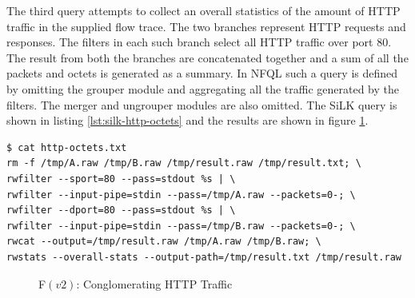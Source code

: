 The third query attempts to collect an overall statistics of the amount of
HTTP traffic in the supplied flow trace. The two branches represent HTTP
requests and responses. The filters in each such branch select all HTTP
traffic over port $80$. The result from both the branches are
 concatenated together and a sum of all
the packets and octets is generated as a summary. In NFQL such a query is
defined by omitting the grouper module and aggregating all the traffic
generated by the filters.  The merger and ungrouper modules are also omitted.
The SiLK query is shown in listing \ref{lst:silk-http-octets} and the results
are shown in figure \ref{fig:summarizing-http-octets}.


\begin{lstlisting}
$ cat http-octets.txt
rm -f /tmp/A.raw /tmp/B.raw /tmp/result.raw /tmp/result.txt; \
rwfilter --sport=80 --pass=stdout %s | \
rwfilter --input-pipe=stdin --pass=/tmp/A.raw --packets=0-; \
rwfilter --dport=80 --pass=stdout %s | \
rwfilter --input-pipe=stdin --pass=/tmp/B.raw --packets=0-; \
rwcat --output=/tmp/result.raw /tmp/A.raw /tmp/B.raw; \
rwstats --overall-stats --output-path=/tmp/result.txt /tmp/result.raw
\end{lstlisting}

\begin{figure}[ht!]
\centering
{}\quad
\caption{F$(v2)$: Conglomerating HTTP Traffic}
\label{fig:summarizing-http-octets}
\end{figure}






